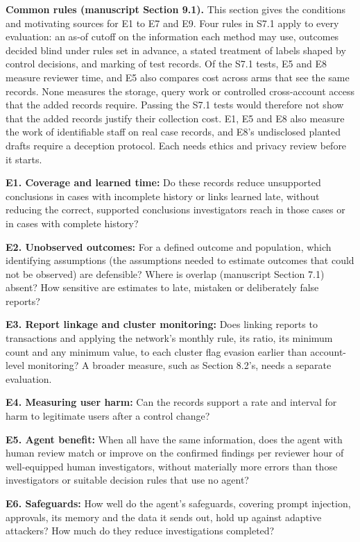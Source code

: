 \documentclass[
  11pt,
]{article}
\begin{document}
\textbf{Common rules (manuscript Section 9.1).} This section gives the
conditions and motivating sources for E1 to E7 and E9. Four rules in
S7.1 apply to every evaluation: an as-of cutoff on the information each
method may use, outcomes decided blind under rules set in advance, a
stated treatment of labels shaped by control decisions, and marking of
test records. Of the S7.1 tests, E5 and E8 measure reviewer time, and E5
also compares cost across arms that see the same records. None measures
the storage, query work or controlled cross-account access that the
added records require. Passing the S7.1 tests would therefore not show
that the added records justify their collection cost. E1, E5 and E8 also
measure the work of identifiable staff on real case records, and E8's
undisclosed planted drafts require a deception protocol. Each needs
ethics and privacy review before it starts.

\textbf{E1. Coverage and learned time:} Do these records reduce
unsupported conclusions in cases with incomplete history or links
learned late, without reducing the correct, supported conclusions
investigators reach in those cases or in cases with complete history?

\textbf{E2. Unobserved outcomes:} For a defined outcome and population,
which identifying assumptions (the assumptions needed to estimate
outcomes that could not be observed) are defensible? Where is overlap
(manuscript Section 7.1) absent? How sensitive are estimates to late,
mistaken or deliberately false reports?

\textbf{E3. Report linkage and cluster monitoring:} Does linking reports
to transactions and applying the network's monthly rule, its ratio, its
minimum count and any minimum value, to each cluster flag evasion
earlier than account-level monitoring? A broader measure, such as
Section 8.2's, needs a separate evaluation.

\textbf{E4. Measuring user harm:} Can the records support a rate and
interval for harm to legitimate users after a control change?

\textbf{E5. Agent benefit:} When all have the same information, does the
agent with human review match or improve on the confirmed findings per
reviewer hour of well-equipped human investigators, without materially
more errors than those investigators or suitable decision rules that use
no agent?

\textbf{E6. Safeguards:} How well do the agent's safeguards, covering
prompt injection, approvals, its memory and the data it sends out, hold
up against adaptive attackers? How much do they reduce investigations
completed?
\end{document}
